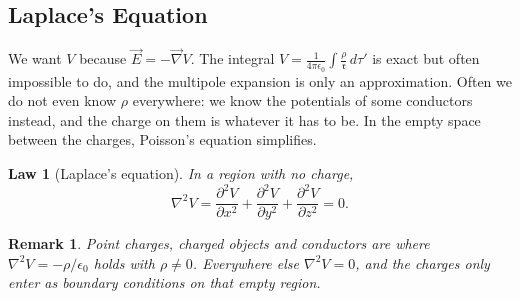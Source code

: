 \documentclass{article}
\newtheorem{law}{Law}
\newtheorem{remark}{Remark}
\begin{document}
\subsection{Laplace's Equation}
We want $V$ because $\vec{E} = -\vec{\nabla}V$. The integral $V = \frac{1}{4\pi\epsilon_0}\int\frac{\rho}{\mathfrak{r}}\,d\tau'$ is exact but often impossible to do, and the multipole expansion is only an approximation. Often we do not even know $\rho$ everywhere: we know the potentials of some conductors instead, and the charge on them is whatever it has to be. In the empty space between the charges, Poisson's equation simplifies.
\begin{law}[Laplace's equation]
    In a region with no charge,
    \begin{equation}
        \nabla^2 V = \frac{\partial^2 V}{\partial x^2} + \frac{\partial^2 V}{\partial y^2} + \frac{\partial^2 V}{\partial z^2} = 0.
    \end{equation}
\end{law}
\begin{remark}
    Point charges, charged objects and conductors are where $\nabla^2 V = -\rho/\epsilon_0$ holds with $\rho \neq 0$. Everywhere else $\nabla^2 V = 0$, and the charges only enter as boundary conditions on that empty region.
\end{remark}
\end{document}
